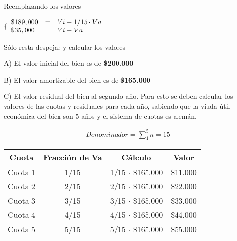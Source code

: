 \documentclass[12pt,a4paper]{article}
\begin{document}
        \par{\hspace{0.5cm}
        	Reemplazando los valores
        	}
        
        \begin{center}
        $
        \lbrace
		\begin{array}{ l c l }
            \$189,000 &=& Vi - 1/15 \cdot Va \\
            \$35,000 &=& Vi - Va
		\end{array}
        $
        \end{center}
        
        \par{\hspace{0.5cm}
        	Sólo resta despejar y calcular los valores
        	}
        
        \hrulefill
        
        A) El valor inicial del bien es de \textbf{\$200.000}
        
        \hrulefill
        
        B) El valor amortizable del bien es de \textbf{\$165.000}
        
        \hrulefill
        
        C) El valor residual del bien al segundo año. Para esto se deben calcular los valores de las cuotas y residuales para cada año, sabiendo que la viuda útil económica del bien son 5 años y el sistema de cuotas es alemán.
        
        \begin{align*}
        	Denominador = \sum_{1}^{5} n = 15
		\end{align*}
        
        \newpage
        
        \begin{table}[H]
        \centering
        	\begin{tabular}{ | c | c | c | c | }
            	\hline
                Cuota	&	Fracción de Va	&	Cálculo					&	Valor		\\ \hline
                Cuota 1	&	1/15			&	1/15 $\cdot$ \$165.000	&	\$11.000	\\ \hline
                Cuota 2	&	2/15			&	2/15 $\cdot$ \$165.000	&	\$22.000	\\ \hline
                Cuota 3	&	3/15			&	3/15 $\cdot$ \$165.000	&	\$33.000	\\ \hline
                Cuota 4	&	4/15			&	4/15 $\cdot$ \$165.000	&	\$44.000	\\ \hline
                Cuota 5	&	5/15			&	5/15 $\cdot$ \$165.000	&	\$55.000	\\ \hline
			\end{tabular}
		\end{table}
        
\end{document}
